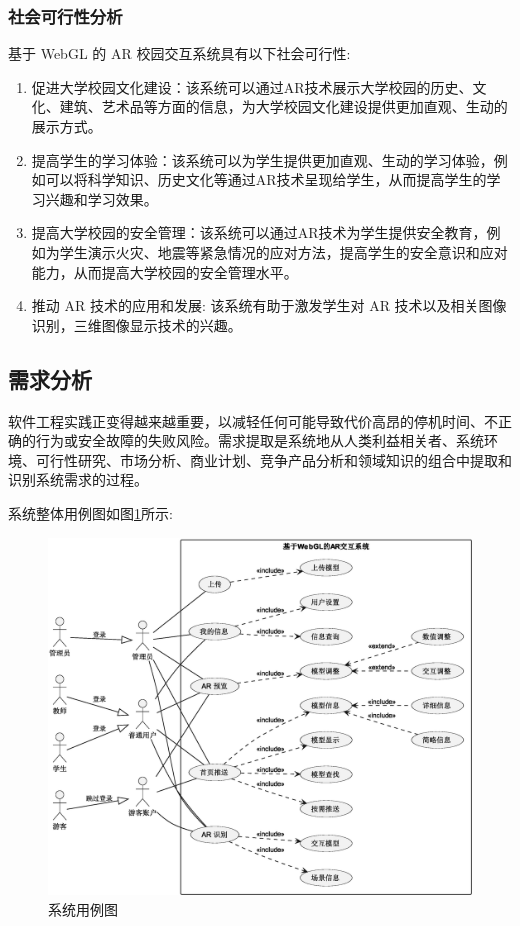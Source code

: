 \subsubsection{社会可行性分析}

基于 WebGL 的 AR 校园交互系统具有以下社会可行性:
\begin{enumerate}
  \item 促进大学校园文化建设：该系统可以通过AR技术展示大学校园的历史、文化、建筑、艺术品等方面的信息，为大学校园文化建设提供更加直观、生动的展示方式。
  \item 提高学生的学习体验：该系统可以为学生提供更加直观、生动的学习体验，例如可以将科学知识、历史文化等通过AR技术呈现给学生，从而提高学生的学习兴趣和学习效果。
  \item 提高大学校园的安全管理：该系统可以通过AR技术为学生提供安全教育，例如为学生演示火灾、地震等紧急情况的应对方法，提高学生的安全意识和应对能力，从而提高大学校园的安全管理水平。
  \item 推动 AR 技术的应用和发展: 该系统有助于激发学生对 AR 技术以及相关图像识别，三维图像显示技术的兴趣。
\end{enumerate}

\subsection{需求分析}

软件工程实践正变得越来越重要，以减轻任何可能导致代价高昂的停机时间、不正确的行为或安全故障的失败风险。需求提取是系统地从人类利益相关者、系统环境、可行性研究、市场分析、商业计划、竞争产品分析和领域知识的组合中提取和识别系统需求的过程\cite{jabar2012software}。

系统整体用例图如图\ref{fig:系统用例图}所示:

\begin{figure}[H]
  \small
  \centering
  \includegraphics[width=\textwidth]{./figs/UserCase.eps}
  \caption{系统用例图}
  \label{fig:系统用例图}
\end{figure}


